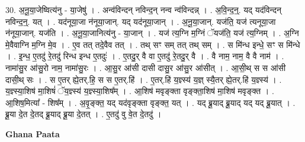 \documentclass[17pt]{extarticle}
\begin{document}
30. अ॒नू॒या॒जेष्वित्य॑नु - या॒जेषु॑ । . अन्व॑विन्दन् नविन्द॒न् नन्व न्व॑विन्दन्न् । . अ॒वि॒न्द॒न्॒. यद् यद॑विन्दन् नविन्द॒न्॒. यत् । . यद॑नूया॒जा न॑नूया॒जान्. यद् यद॑नूया॒जान् । . अ॒नू॒या॒जान्. यज॑ति॒ यज॑ त्यनूया॒जा न॑नूया॒जान्. यज॑ति । . अ॒नू॒या॒जानित्य॑नु - या॒जान् । . यज॑ त्य॒ग्नि म॒ग्निं ॅयज॑ति॒ यज॑ त्य॒ग्निम् । . अ॒ग्नि मे॒वैवाग्नि म॒ग्नि मे॒व । . ए॒व तत् तदे॒वैव तत् । . तथ् सꣳ सम् तत् तथ् सम् । . स मि॑न्ध इन्धे॒ सꣳ स मि॑न्धे । . इ॒न्ध॒ ए॒तदु॑ रे॒तदु॑ रिन्ध इन्ध ए॒तदुः॑ । . ए॒तदु॒र् वै वा ए॒तदु॑ रे॒तदु॒र् वै । . वै नाम॒ नाम॒ वै वै नाम॑ । . नामा॑सु॒र आ॑सु॒रो नाम॒ नामा॑सु॒रः । . आ॒सु॒र आ॑सी दासी दासु॒र आ॑सु॒र आ॑सीत् । . आ॒सी॒थ् स स आ॑सी दासी॒थ् सः । . स ए॒तर् ह्ये॒तर्.हि॒ स स ए॒तर्.हि॑ । . ए॒तर्.हि॑ य॒ज्ञ्स्य॑ य॒ज्ञ् स्यै॒तर् ह्ये॒तर्.हि॑ य॒ज्ञ्स्य॑ । . य॒ज्ञ्स्या॒शिष॑ मा॒शिषं॑ ॅय॒ज्ञ्स्य॑ य॒ज्ञ्स्या॒शिष᳚म् । . आ॒शिष॑ मवृङ्क्ता वृङ्क्ता॒शिष॑ मा॒शिष॑ मवृङ्क्त । . आ॒शिष॒मित्या᳚ - शिष᳚म् । . अ॒वृ॒ङ्क्त॒ यद् यद॑वृङ्क्ता वृङ्क्त॒ यत् । . यद् ब्रू॒याद् ब्रू॒याद् यद् यद् ब्रू॒यात् । . ब्रू॒या दे॒त दे॒तद् ब्रू॒याद् ब्रू॒या दे॒तत् । . ए॒तदु॑ वु वे॒त दे॒तदु॑ । \newline

\textbf{Ghana Paata } \newline
\end{document}
